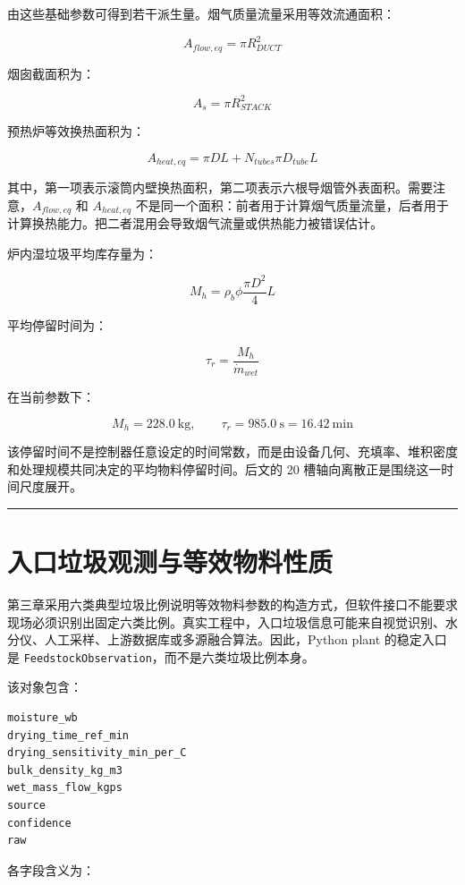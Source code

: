 \documentclass[UTF8,openany,zihao=-4,oneside]{ctexbook}
\providecommand{\passthrough}[1]{#1}
\newcommand{\manualdivider}{\par\vspace{0.6em}\noindent\textcolor{FGLine}{\rule{\linewidth}{0.7pt}}\vspace{0.6em}\par}
\begin{document}
由这些基础参数可得到若干派生量。烟气质量流量采用等效流通面积：

\[
A_{flow,eq}=\pi R_{DUCT}^2
\]

烟囱截面积为：

\[
A_s=\pi R_{STACK}^2
\]

预热炉等效换热面积为：

\[
A_{heat,eq}=\pi DL+N_{tubes}\pi D_{tube}L
\]

其中，第一项表示滚筒内壁换热面积，第二项表示六根导烟管外表面积。需要注意，\(A_{flow,eq}\) 和 \(A_{heat,eq}\) 不是同一个面积：前者用于计算烟气质量流量，后者用于计算换热能力。把二者混用会导致烟气流量或供热能力被错误估计。

炉内湿垃圾平均库存量为：

\[
M_h=\rho_b\phi\frac{\pi D^2}{4}L
\]

平均停留时间为：

\[
\tau_r=\frac{M_h}{\dot m_{wet}}
\]

在当前参数下：

\[
M_h=228.0\ \mathrm{kg},\qquad \tau_r=985.0\ \mathrm{s}=16.42\ \mathrm{min}
\]

该停留时间不是控制器任意设定的时间常数，而是由设备几何、充填率、堆积密度和处理规模共同决定的平均物料停留时间。后文的 20 槽轴向离散正是围绕这一时间尺度展开。

\manualdivider

\section{入口垃圾观测与等效物料性质}\label{ux5165ux53e3ux5783ux573eux89c2ux6d4bux4e0eux7b49ux6548ux7269ux6599ux6027ux8d28}

第三章采用六类典型垃圾比例说明等效物料参数的构造方式，但软件接口不能要求现场必须识别出固定六类比例。真实工程中，入口垃圾信息可能来自视觉识别、水分仪、人工采样、上游数据库或多源融合算法。因此，Python plant 的稳定入口是 \passthrough{\lstinline!FeedstockObservation!}，而不是六类垃圾比例本身。

该对象包含：

\begin{lstlisting}
moisture_wb
drying_time_ref_min
drying_sensitivity_min_per_C
bulk_density_kg_m3
wet_mass_flow_kgps
source
confidence
raw
\end{lstlisting}

各字段含义为：
\end{document}
